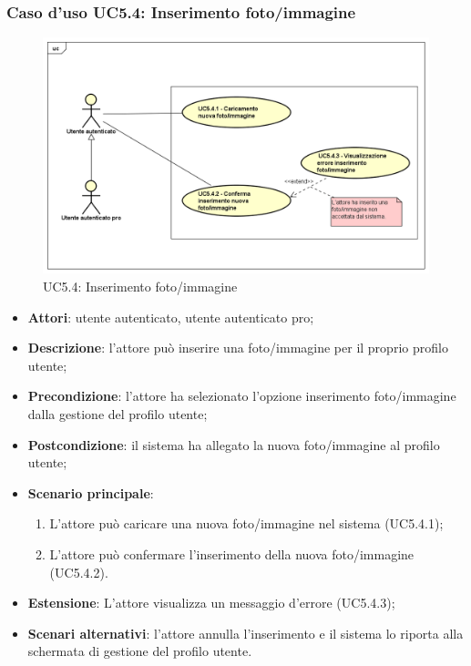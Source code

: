 \subsubsection{Caso d'uso UC5.4: Inserimento foto/immagine}
\label{UC5.4}
\begin{figure}[h]
	\centering
	\includegraphics[scale=0.5,keepaspectratio]{UML/UC5_4.png}
	\caption{UC5.4: Inserimento foto/immagine}
\end{figure}
\begin{itemize}
	\item \textbf{Attori}: utente autenticato, utente autenticato pro;
	\item \textbf{Descrizione}: l'attore può inserire una foto/immagine per il proprio profilo utente;
	\item \textbf{Precondizione}: l'attore ha selezionato l'opzione inserimento foto/immagine dalla gestione del profilo utente; 
	\item \textbf{Postcondizione}: il sistema ha allegato la nuova foto/immagine al profilo utente;
	\item \textbf{Scenario principale}:
	\begin{enumerate}
		\item L'attore può caricare una nuova foto/immagine nel sistema (UC5.4.1);
		\item L'attore può confermare l'inserimento della nuova foto/immagine (UC5.4.2).
	\end{enumerate}
	\item \textbf{Estensione}: L'attore visualizza un messaggio d'errore (UC5.4.3);
	\item \textbf{Scenari alternativi}: l'attore annulla l'inserimento e il sistema lo riporta alla schermata di gestione del profilo utente.
\end{itemize}

